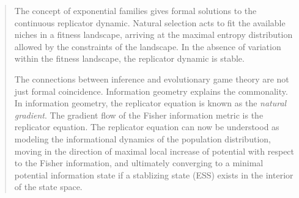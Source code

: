 \documentclass[a4paper,10pt]{article}
\begin{document}
\begin{quotation}
    The concept of exponential families gives formal solutions
    to the continuous replicator dynamic.
    Natural selection acts to fit the available niches in a fitness landscape, arriving at the maximal entropy distribution allowed by the constraints of the landscape. In the absence of variation within the fitness landscape, the replicator dynamic is stable.
    
    The connections between inference and evolutionary game theory are not just formal coincidence. Information geometry explains the commonality.
    In information geometry, the replicator equation is known as the \emph{natural gradient}.
    The gradient flow of the Fisher information metric is the replicator equation.
    The replicator equation can now be understood as modeling the informational dynamics of the population distribution, moving in the direction of maximal local increase of potential with respect to the Fisher information, and ultimately converging to a minimal potential information state if a stablizing state (ESS) exists in the interior of the state space.
    
\end{quotation}

\\
\end{document}

